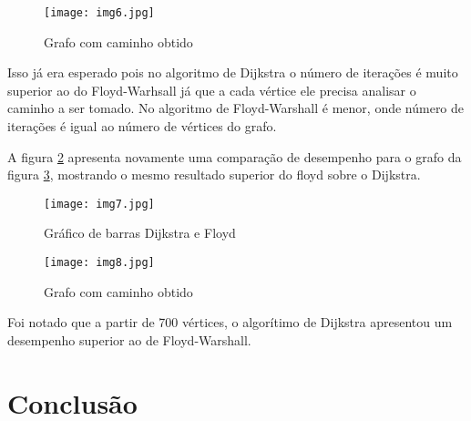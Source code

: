 \documentclass[
12pt,				%
openright,			%
oneside,			%
a4paper,			%
english,			%
french,				%
spanish,			%
brazil,				%
]{abntex2}
\begin{document}
	\begin{figure}[h!]
		\centering
		\texttt{[image: img6.jpg]}
		\caption{Grafo com caminho obtido}
		\label{img6}
	\end{figure}
	\FloatBarrier
  Isso já era esperado pois no algoritmo de Dijkstra o número de iterações é muito superior ao do Floyd-Warhsall já que a cada vértice ele precisa analisar o caminho a ser tomado. No algoritmo de Floyd-Warshall é menor, onde número de iterações é igual ao número de vértices do grafo.
  
  A figura \ref{img7} apresenta novamente uma comparação de desempenho para o grafo da figura \ref{img8}, mostrando o mesmo resultado superior do floyd sobre o Dijkstra.
  
  \begin{figure}[h!]
  	\centering
  	\texttt{[image: img7.jpg]}
  	\caption{Gráfico de barras Dijkstra e Floyd}
  	\label{img7}
  \end{figure}

	\begin{figure}[h!]
		\centering
		\texttt{[image: img8.jpg]}
		\caption{Grafo com caminho obtido}
		\label{img8}
	\end{figure}
  	
  	\FloatBarrier
  	
  	Foi notado que a partir de 700 vértices, o algorítimo de Dijkstra apresentou um desempenho superior ao de Floyd-Warshall.
	\chapter{Conclusão}
	
	
	
	
\end{document}

